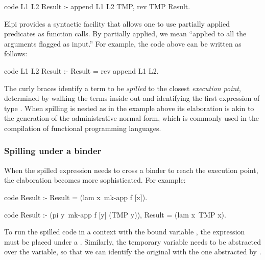 \documentclass{these-ISSS}
\newenvironment{elpicode}
  {\VerbatimEnvironment\begin{elpibox}\begin{xelpicode}}{\end{xelpicode}
\end{elpibox}}
\begin{document}
\begin{elpicode}
code L1 L2 Result :- append L1 L2 TMP, rev TMP Result.
\end{elpicode}
Elpi provides a syntactic facility that allows one to use partially applied
predicates as function calls. By partially applied, we mean ``applied to all
the arguments flagged as input.'' For example, the code above can be written as
follows:
\begin{elpicode}
code L1 L2 Result :- Result = {rev {append L1 L2}}.
\end{elpicode}
\noindent
The curly braces identify a term to be \emph{spilled} to the closest
\emph{execution point}, determined by walking the terms inside out
and identifying the first expression of type .
When spilling is nested as in the example above its elaboration is akin to
the generation of the
administrative normal form, which is commonly used in 
the compilation of functional programming
languages.

\subsubsection{Spilling under a binder}


When the spilled expression needs to cross a binder to reach the execution
point, the elaboration becomes more sophisticated. For example:

\begin{elpicode}
code Result :- Result = (lam x\ {mk-app f [x]}).

code Result :- (pi y\ mk-app f [y] (TMP y)), Result = (lam x\ TMP x).
\end{elpicode}

\noindent
To run the spilled code in a context with the bound variable , the
expression must be placed under a . %
Similarly, the temporary
variable  needs to be abstracted over the variable, so that we can identify
the original  with the one abstracted by .


\end{document}
